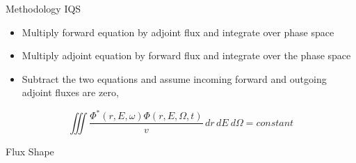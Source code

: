 
\begin{frame}{Methodology IQS}
   \begin{itemize}
       \item     Multiply forward equation by adjoint flux and integrate over phase space
       \item Multiply adjoint equation by forward flux and integrate over the phase space
       \item Subtract the two equations and assume incoming forward and outgoing adjoint fluxes are zero,
   \end{itemize}

\begin{equation}
    \iiint \frac{\Phi^*(r,E,\omega)\Phi(r,E,\Omega,t)}{v} \,dr\,dE\ d\Omega = constant
\end{equation}

\end{frame}


\begin{frame}{Flux Shape}
    


\end{frame}